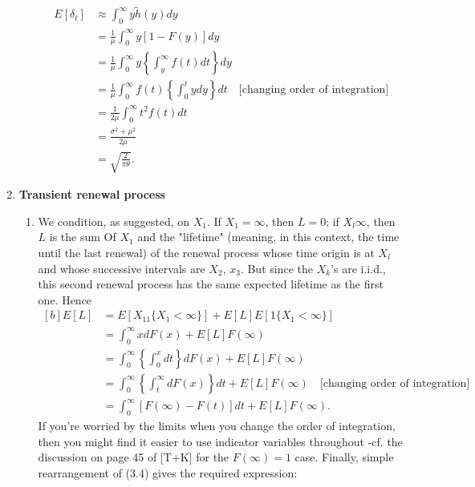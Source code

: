 \documentclass[11pt,a4paper]{article}
\begin{document}
\begin{enumerate}
\begin{enumerate}
      \begin{align*}
        E[\delta_t]
        &\approx \int_0^\infty y\tilde{h}(y)dy\\
        &= \frac{1}{\mu}\int_0^\infty y[1 - F(y)]dy\\
        &= \frac{1}{\mu}\int_0^\infty y\left\{\int_y^\infty f(t)dt\right\}dy\\
        &= \frac{1}{\mu}\int_0^\infty f(t)\left\{\int_0^t ydy\right\}dt\quad\text{[changing order of integration]}\\
        &= \frac{1}{2\mu}\int_0^\infty t^2f(t)dt\\
        &= \frac{\sigma^2 + \mu^2}{2\mu}\\
        &= \sqrt{\frac{2}{\pi\theta}}.
      \end{align*}
    \end{enumerate}
    \item \textbf{Transient renewal process}
    \begin{enumerate}
      \item We condition, as suggested, on $X_1$. If $X_1 = \infty$, then $L = 0$; if $X_l \infty$, then $L$ is the sum Of $X_1$ and the "lifetime" (meaning, in this context, the time until the last renewal) of the renewal process whose time origin is at $X_l$ and whose successive intervals are $X_2,\, x_3$. But since the $X_k$'s are i.i.d., this second renewal process has the same expected lifetime as the first one. Hence
      \begin{equation}\tag{3.4}
        \begin{aligned}[b]
          E[L]
          &= E[X_11\{X_1 < \infty\}] + E[L]E[1\{X_1 < \infty\}]\\
          &= \int_0^\infty xdF(x) + E[L]F(\infty)\\
          &= \int_0^\infty \left\{\int_0^x dt\right\}dF(x) + E[L]F(\infty)\\
          &= \int_0^\infty\left\{\int_t^\infty dF(x)\right\}dt + E[L]F(\infty)\quad \text{[changing order of integration]}\\
          &= \int_0^\infty [F(\infty) - F(t)]dt + E[L]F(\infty).
        \end{aligned}
      \end{equation}
      If you're worried by the limits when you change the order of integration, then you might find it easier to use indicator variables throughout -cf. the discussion on page 45 of [T+K] for the $F(\infty) = 1$ case. Finally, simple rearrangement of (3.4) gives the required expression:
      \begin{equation}\tag{3.6}

\end{equation}
\end{enumerate}
\end{enumerate}
\end{document}
